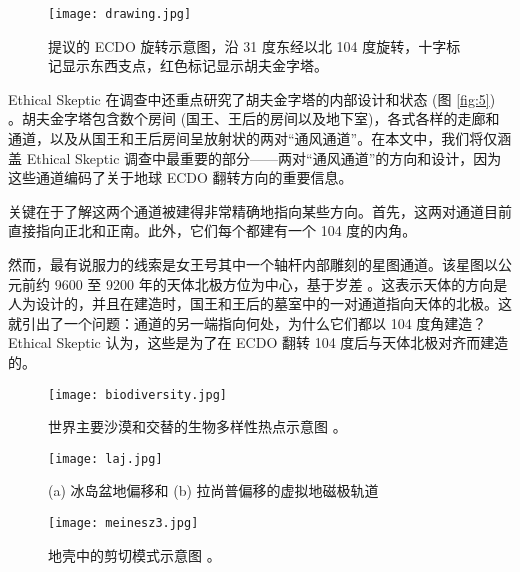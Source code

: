 \documentclass[10pt,twocolumn,letterpaper]{article}
\begin{document}
\begin{figure*}[b]
\begin{center}
\texttt{[image: drawing.jpg]}
\end{center}
   \caption{提议的 ECDO 旋转示意图，沿 31 度东经以北 104 度旋转，十字标记显示东西支点，红色标记显示胡夫金字塔。}
\label{fig:6}
\end{figure*}

Ethical Skeptic 在调查中还重点研究了胡夫金字塔的内部设计和状态 (图 \ref{fig:5}) \cite{28}。胡夫金字塔包含数个房间 (国王、王后的房间以及地下室)，各式各样的走廊和通道，以及从国王和王后房间呈放射状的两对“通风通道”\cite{29,30}。在本文中，我们将仅涵盖 Ethical Skeptic 调查中最重要的部分——两对“通风通道”的方向和设计，因为这些通道编码了关于地球 ECDO 翻转方向的重要信息。

关键在于了解这两个通道被建得非常精确地指向某些方向。首先，这两对通道目前直接指向正北和正南。此外，它们每个都建有一个 104 度的内角。

然而，最有说服力的线索是女王号其中一个轴杆内部雕刻的星图通道。该星图以公元前约 9600 至 9200 年的天体北极方位为中心，基于岁差 \cite{28}。这表示天体的方向是人为设计的，并且在建造时，国王和王后的墓室中的一对通道指向天体的北极。这就引出了一个问题：通道的另一端指向何处，为什么它们都以 104 度角建造？Ethical Skeptic 认为，这些是为了在 ECDO 翻转 104 度后与天体北极对齐而建造的。

\begin{figure*}[t]
\begin{center}
\texttt{[image: biodiversity.jpg]}
\end{center}
   \caption{世界主要沙漠和交替的生物多样性热点示意图 \cite{28}。}
\label{fig:9}
\end{figure*}

\begin{figure}[t]
\begin{center}
   \texttt{[image: laj.jpg]}
\end{center}
   \caption{(a) 冰岛盆地偏移和 (b) 拉尚普偏移的虚拟地磁极轨道 \cite{35}}
\label{fig:7}
\label{fig:onecol}
\end{figure}

\begin{figure}[t]
\begin{center}
   \texttt{[image: meinesz3.jpg]}
\end{center}
   \caption{地壳中的剪切模式示意图 \cite{36}。}
\label{fig:8}
\label{fig:onecol}
\end{figure}
\end{document}
